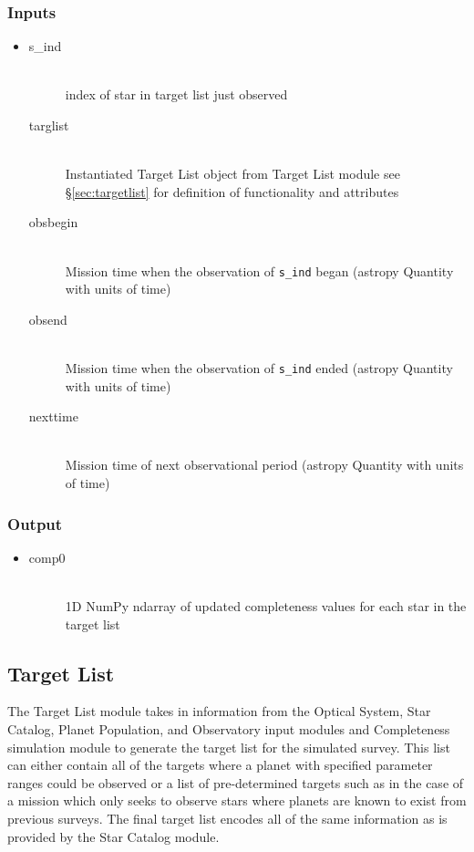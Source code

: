 \documentclass[cleanfoot]{asme2ej}
\begin{document}
\subsubsection*{Inputs}
\begin{itemize}
    \item 
    \begin{description}
        \item[s\_ind] \hfill \\
        index of star in target list just observed
        \item[targlist] \hfill \\
        Instantiated Target List object from Target List module see \S\ref{sec:targetlist} for definition of functionality and attributes
        \item[obsbegin] \hfill \\
        Mission time when the observation of \verb+s_ind+ began (astropy Quantity with units of time)
        \item[obsend] \hfill \\
        Mission time when the observation of \verb+s_ind+ ended (astropy Quantity with units of time)
        \item[nexttime] \hfill \\
        Mission time of next observational period (astropy Quantity with units of time)
    \end{description}
\end{itemize}

\subsubsection*{Output}
\begin{itemize}
    \item 
    \begin{description}
        \item[comp0] \hfill \\
        1D NumPy ndarray of updated completeness values for each star in the target list
    \end{description}
\end{itemize}


\subsection{Target List}
The Target List module takes in information from the Optical System, Star Catalog, Planet Population, and Observatory input modules and Completeness simulation module to generate the target list for the simulated survey.  This list can either contain all of the targets where a planet with specified parameter ranges could be observed or a list of pre-determined targets such as in the case of a mission which only seeks to observe stars where planets are known to exist from previous surveys.  The final target list encodes all of the same information as is provided by the Star Catalog module.
\end{document}

